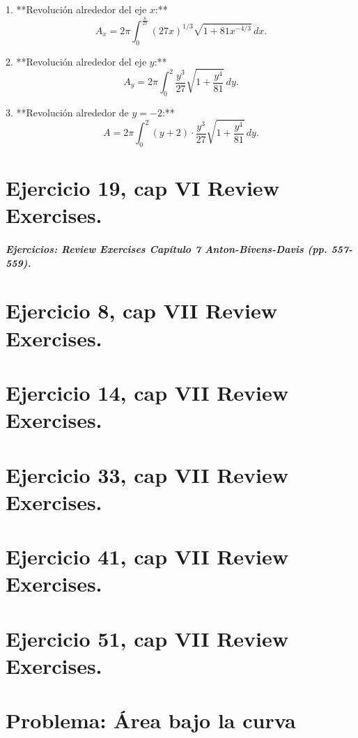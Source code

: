 \documentclass[11pt,letterpaper]{article}
\begin{document}
1. **Revolución alrededor del eje \(x\):**
\[
A_x = 2\pi \int_{0}^{\frac{8}{27}} (27x)^{1/3} \sqrt{1 + 81x^{-4/3}} \, dx.
\]

2. **Revolución alrededor del eje \(y\):**
\[
A_y = 2\pi \int_{0}^{2} \frac{y^3}{27} \sqrt{1 + \frac{y^4}{81}} \, dy.
\]

3. **Revolución alrededor de \(y = -2\):**
\[
A = 2\pi \int_{0}^{2} (y + 2) \cdot \frac{y^3}{27} \sqrt{1 + \frac{y^4}{81}} \, dy.
\]


\section{Ejercicio 19, cap VI Review Exercises.}



\subparagraph{Ejercicios: Review Exercises Capítulo 7 Anton-Bivens-Davis (pp. 557-559).}

\section{Ejercicio 8, cap VII Review Exercises.}

\section{Ejercicio 14, cap VII Review Exercises.}

\section{Ejercicio 33, cap VII Review Exercises.}

\section{Ejercicio 41, cap VII Review Exercises.}

\section{Ejercicio 51, cap VII Review Exercises.}
\section*{Problema: Área bajo la curva}
\end{document}
